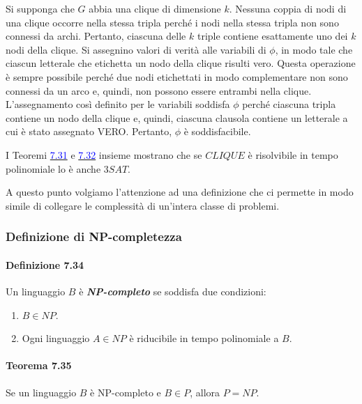 \documentclass{article}
\begin{document}
Si supponga che $G$ abbia una clique di dimensione $k$. 
Nessuna coppia di nodi di una clique occorre nella stessa tripla perché i nodi nella stessa tripla non sono connessi da archi. 
Pertanto, ciascuna delle $k$ triple contiene esattamente uno dei $k$ nodi della clique. 
Si assegnino valori di verità alle
variabili di $\phi$, in modo tale che ciascun letterale che etichetta un nodo della clique risulti vero.
Questa operazione è sempre possibile perché due nodi etichettati in modo complementare non sono connessi da un arco e, quindi, non possono essere entrambi nella clique.
L'assegnamento così definito per
le variabili soddisfa $\phi$ perché ciascuna tripla contiene un nodo della clique e, quindi, ciascuna clausola contiene un letterale a cui è stato assegnato VERO. 
Pertanto, $\phi$ è soddisfacibile.

I Teoremi \hyperref[teorema-7.31]{\textcolor{blue}{7.31}} e \hyperref[teorema-7.32]{\textcolor{blue}{7.32}} insieme mostrano che se $CLIQUE$ è risolvibile in tempo polinomiale lo è anche $3SAT$.

A questo punto volgiamo l'attenzione ad una definizione che ci permette in modo simile di collegare le complessità di un'intera classe di problemi.

\subsubsection{Definizione di NP-completezza}
\paragraph{Definizione 7.34}
\label{definizione-7.34}
\vspace{1em}
\text{}
\newline
\begin{tcolorbox}
    Un linguaggio $B$ è \textit{\textbf{NP-completo}} se soddisfa due condizioni:
    \begin{enumerate}
        \item $B \in NP$.
        \item Ogni linguaggio $A \in NP$ è riducibile in tempo polinomiale a $B$.
    \end{enumerate}
\end{tcolorbox}

\paragraph{Teorema 7.35}
\label{teorema-7.35}
\vspace{1em}
\text{}
\newline
Se un linguaggio $B$ è NP-completo e $B \in P$, allora $P = NP$.
\end{document}
